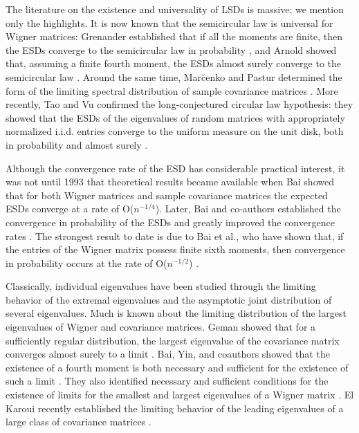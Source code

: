 \documentclass[11pt,letterpaper,twoside,reqno,nosumlimits]{amsart}
\theoremstyle{remark}
\numberwithin{equation}{section}
\numberwithin{thm}{section}
\numberwithin{prop}{section}
\numberwithin{defn}{section}
\numberwithin{remark}{section}
\begin{document}
	The literature on the existence and universality of LSDs is massive; we mention only the highlights. It is now known that the semicircular law is universal for Wigner matrices: Grenander established that if all the moments are finite, then the ESDs converge to the semicircular law in probability \cite{Grenander63}, and Arnold showed that, assuming a finite fourth moment, the ESDs almost surely converge to the semicircular law \cite{Arnold71}. Around the same time, Mar\u{c}enko and Pastur determined the form of the limiting spectral distribution of sample covariance matrices \cite{MarcenkoPastur67}. More recently, Tao and Vu confirmed the long-conjectured circular law hypothesis: they showed that the ESDs of the eigenvalues of random matrices with appropriately normalized i.i.d. entries converge to the uniform measure on the unit disk, both in probability and almost surely \cite{TaoVu10a}.


Although the convergence rate of the ESD has considerable practical interest, it was not until 1993 that theoretical results became available when Bai showed that for both Wigner matrices \cite{Bai93a} and sample covariance matrices \cite{Bai93b} the expected ESDs converge at a rate of O($n^{-1/4}$). Later, Bai and co-authors established the convergence in probability of the ESDs \cite{Bai97} and greatly improved the convergence rates \cite{BaiWigner99,Bai02,Bai03}. The strongest result to date is due to Bai et al., who have shown that, if the entries of the Wigner matrix possess finite sixth moments, then convergence in probability occurs at the rate of O($n^{-1/2}$) \cite{Bai11}. 

Classically, individual eigenvalues have been studied through the limiting behavior of the extremal eigenvalues and the asymptotic joint distribution of several eigenvalues. Much is known about the limiting distribution of the largest eigenvalues of Wigner and covariance matrices. Geman showed that for a sufficiently regular distribution, the largest eigenvalue of the covariance matrix converges almost surely to a limit \cite{Geman80}. Bai, Yin, and coauthors showed that the existence of a fourth moment is both necessary and sufficient for the existence of such a limit \cite{YinBaiKrishnaiah88,BaiSilversteinYin88}. They also identified necessary and sufficient conditions for the existence of limits for the smallest and largest eigenvalues of a Wigner matrix \cite{BY88b}. El Karoui recently established the limiting behavior of the leading eigenvalues of a large class of covariance matrices \cite{ElKaroui07}. 
\end{document}
